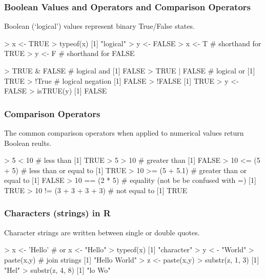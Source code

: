 \documentclass{beamer}
\begin{document}
\begin{frame}[fragile]
  \frametitle{Boolean Values and Operators and Comparison Operators }

 Boolean (`logical') values represent binary True/False states.

\begin{Rcode}
> x <- TRUE
> typeof(x)
[1] "logical"
> y <- FALSE
> x <- T # shorthand for TRUE
> y <- F # shorthand for FALSE
\end{Rcode}

\begin{Rcode}
> TRUE & FALSE   # logical and
[1] FALSE
> TRUE | FALSE   # logical or
[1] TRUE
> !True          # logical negation
[1] FALSE
> !FALSE
[1] TRUE
> y <- FALSE
> isTRUE(y)
[1] FALSE
\end{Rcode}

\end{frame}


\begin{frame}[fragile]
  \frametitle{Comparison Operators}

The common comparison operators when applied to numerical values return Boolean reults.

\begin{Rcode}
> 5 < 10  # less than
[1] TRUE
> 5 > 10 # greater than
[1] FALSE
> 10 <= (5 + 5) # less than or equal to
[1] TRUE
> 10 >= (5 + 5.1) # greater than or equal to
[1] FALSE
> 10 == (2 * 5)  # equality (not be be confused with =)
[1] TRUE
> 10 != (3 + 3 + 3 + 3) # not equal to
[1] TRUE
\end{Rcode}
\end{frame}


\begin{frame}[fragile]
  \frametitle{Characters (strings) in R}


Character strings are written between single or double quotes.

\begin{Rcode}
> x <- 'Hello' # or x <- "Hello"
> typeof(x)
[1] "character"
> y < - "World"
> paste(x,y)  # join strings
[1] "Hello World"
> z <- paste(x,y)
> substr(z, 1, 3)
[1] "Hel"
> substr(z, 4, 8)
[1] "lo Wo"
\end{Rcode}



\end{frame}
\end{document}
